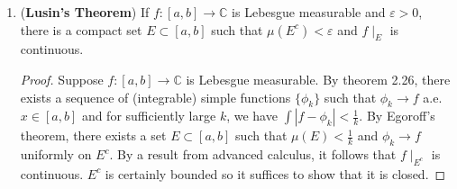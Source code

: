 \documentclass[11pt,oneside,english]{amsart}
\theoremstyle{definition}
\newcommand{\ve}{\varepsilon}
\begin{document}
\begin{enumerate}
\begin{proof}
Returning to our original proof, by hypothesis, $\int|f_n-f|\rightarrow 0$, and by Chebyshev's inequality,

\[
\mu(E_n(k))=\mu\left(\left\{x\,\Big|\, |f_n(x)-f(x)|\geq\frac{1}{k}\right\}\right)=\leq k\int_{|f_n-f|\geq\frac{1}{k}}|f_n-f|\,d\mu\leq k\int_X|f_n-f|\,d\mu\rightarrow 0.
\]

Consequently, $\mu(E_n(k))\rightarrow 0$ as required, and the rest of the proof of Egoroff's theorem holds.
\end{proof}

\setcounter{enumi}{43}

\item (\textbf{Lusin's Theorem}) If $f:[a,b]\rightarrow \mathbb{C}$ is Lebesgue measurable and $\ve>0$, there is a compact set $E\subset[a,b]$ such that $\mu(E^c)<\ve$ and $f\mid_E$ is continuous.

\begin{proof}
Suppose $f:[a,b]\rightarrow \mathbb{C}$ is Lebesgue measurable. By theorem 2.26, there exists a sequence of (integrable) simple functions $\{\phi_k\}$ such that $\phi_k\rightarrow f$ a.e. $x\in [a,b]$ and for sufficiently large $k$, we have $\int|f-\phi_k|<\frac{1}{k}$. By Egoroff's theorem, there exists a set $E\subset[a,b]$ such that $\mu(E)<\frac{1}{k}$ and $\phi_k\rightarrow f$ uniformly on $E^c$. By a result from advanced calculus, it follows that $f\mid_{E^c}$ is continuous. $E^c$ is certainly bounded so it suffices to show that it is closed.
\end{proof}



\end{enumerate}
\end{document}
